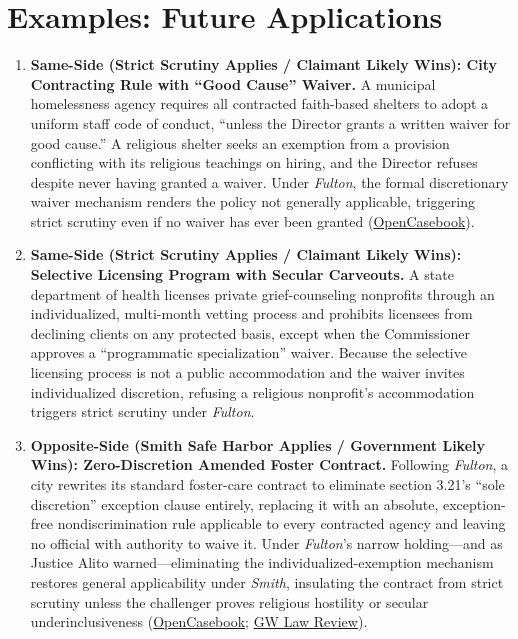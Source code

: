 \documentclass[12pt]{article}
\begin{document}
\section{Examples: Future Applications}
\begin{enumerate}
    \item \textbf{Same-Side (Strict Scrutiny Applies / Claimant Likely Wins): City Contracting Rule with ``Good Cause'' Waiver.} A municipal homelessness agency requires all contracted faith-based shelters to adopt a uniform staff code of conduct, ``unless the Director grants a written waiver for good cause.'' A religious shelter seeks an exemption from a provision conflicting with its religious teachings on hiring, and the Director refuses despite never having granted a waiver. Under \textit{Fulton}, the formal discretionary waiver mechanism renders the policy not generally applicable, triggering strict scrutiny even if no waiver has ever been granted (\href{https://opencasebook.org/casebooks/4501-constitutional-law/resources/12.9-fulton-v-city-of-philadelphia-2020/}{OpenCasebook}).
    \item \textbf{Same-Side (Strict Scrutiny Applies / Claimant Likely Wins): Selective Licensing Program with Secular Carveouts.} A state department of health licenses private grief-counseling nonprofits through an individualized, multi-month vetting process and prohibits licensees from declining clients on any protected basis, except when the Commissioner approves a ``programmatic specialization'' waiver. Because the selective licensing process is not a public accommodation and the waiver invites individualized discretion, refusing a religious nonprofit's accommodation triggers strict scrutiny under \textit{Fulton}.
    \item \textbf{Opposite-Side (Smith Safe Harbor Applies / Government Likely Wins): Zero-Discretion Amended Foster Contract.} Following \textit{Fulton}, a city rewrites its standard foster-care contract to eliminate section 3.21's ``sole discretion'' exception clause entirely, replacing it with an absolute, exception-free nondiscrimination rule applicable to every contracted agency and leaving no official with authority to waive it. Under \textit{Fulton}'s narrow holding---and as Justice Alito warned---eliminating the individualized-exemption mechanism restores general applicability under \textit{Smith}, insulating the contract from strict scrutiny unless the challenger proves religious hostility or secular underinclusiveness (\href{https://opencasebook.org/casebooks/4501-constitutional-law/resources/12.9-fulton-v-city-of-philadelphia-2020/}{OpenCasebook}; \href{https://www.gwlr.org/two-surprises-in-fulton-v-city-of-philadelphia/}{GW Law Review}).

\end{enumerate}
\end{document}
